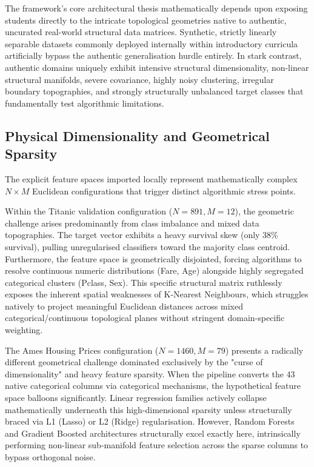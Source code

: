 \documentclass[conference]{IEEEtran}
\begin{document}
The framework's core architectural thesis mathematically depends upon exposing students directly to the intricate topological geometries native to authentic, uncurated real-world structural data matrices. Synthetic, strictly linearly separable datasets commonly deployed internally within introductory curricula artificially bypass the authentic generalisation hurdle entirely. In stark contrast, authentic domains uniquely exhibit intensive structural dimensionality, non-linear structural manifolds, severe covariance, highly noisy clustering, irregular boundary topographies, and strongly structurally unbalanced target classes that fundamentally test algorithmic limitations.

\subsection{Physical Dimensionality and Geometrical Sparsity}

The explicit feature spaces imported locally represent mathematically complex $N \times M$ Euclidean configurations that trigger distinct algorithmic stress points. 

Within the Titanic validation configuration ($N=891, M=12$), the geometric challenge arises predominantly from class imbalance and mixed data topographies. The target vector exhibits a heavy survival skew (only 38\% survival), pulling unregularised classifiers toward the majority class centroid. Furthermore, the feature space is geometrically disjointed, forcing algorithms to resolve continuous numeric distributions (Fare, Age) alongside highly segregated categorical clusters (Pclass, Sex). This specific structural matrix ruthlessly exposes the inherent spatial weaknesses of K-Nearest Neighbours, which struggles natively to project meaningful Euclidean distances across mixed categorical/continuous topological planes without stringent domain-specific weighting.

The Ames Housing Prices configuration ($N=1460, M=79$) presents a radically different geometrical challenge dominated exclusively by the "curse of dimensionality" and heavy feature sparsity. When the pipeline converts the 43 native categorical columns via categorical mechanisms, the hypothetical feature space balloons significantly. Linear regression families actively collapse mathematically underneath this high-dimensional sparsity unless structurally braced via L1 (Lasso) or L2 (Ridge) regularisation. However, Random Forests and Gradient Boosted architectures structurally excel exactly here, intrinsically performing non-linear sub-manifold feature selection across the sparse columns to bypass orthogonal noise.
\end{document}
